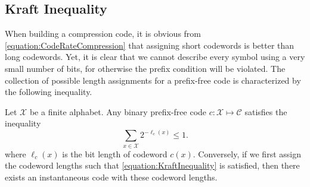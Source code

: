 \subsection{Kraft Inequality}

When building a compression code, it is obvious from \eqref{equation:CodeRateCompression} that assigning short codewords is better than long codewords.
Yet, it is clear that we cannot describe every symbol using a very small number of bits, for otherwise the prefix condition will be violated.
The collection of possible length assignments for a prefix-free code is characterized by the following inequality.

\begin{theorem}
Let $\mathcal{X}$ be a finite alphabet.
Any binary prefix-free code $c : \mathcal{X} \mapsto \mathcal{C}$ satisfies the inequality
\begin{equation} \label{equation:KraftInequality}
\sum_{x \in \mathcal{X}} 2^{-\ell_c(x)} \leq 1.
\end{equation}
where $\ell_c(x)$ is the bit length of codeword $c(x)$.
Conversely, if we first assign the codeword lengths such that \eqref{equation:KraftInequality} is satisfied, then there exists an instantaneous code with these codeword lengths.
\end{theorem}
